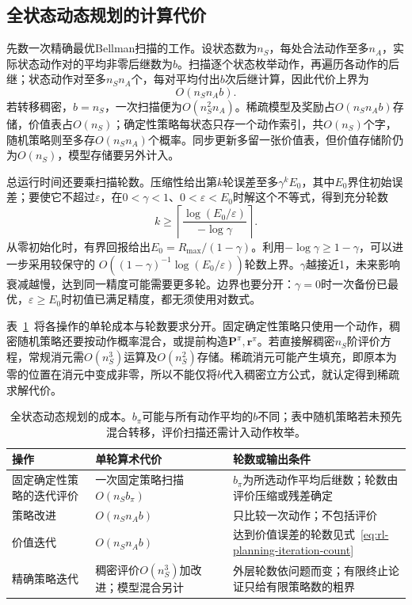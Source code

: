 \subsection{全状态动态规划的计算代价}
\label{sec:rl-planning-dp-complexity}

先数一次精确最优Bellman扫描的工作。设状态数为$n_S$，每处合法动作至多$n_A$，实际状态动作对的平均非零后继数为$b$。扫描逐个状态枚举动作，再遍历各动作的后继；状态动作对至多$n_Sn_A$个，每对平均付出$b$次后继计算，因此代价上界为
\begin{equation}
 O(n_Sn_Ab).
 \label{eq:rl-planning-sweep-cost}
\end{equation}
若转移稠密，$b=n_S$，一次扫描便为$O(n_S^2n_A)$。稀疏模型及奖励占$O(n_Sn_Ab)$存储，价值表占$O(n_S)$；确定性策略每状态只存一个动作索引，共$O(n_S)$个字，随机策略则至多存$O(n_Sn_A)$个概率。同步更新多留一张价值表，但价值存储阶仍为$O(n_S)$，模型存储要另外计入。

总运行时间还要乘扫描轮数。压缩性给出第$k$轮误差至多$\gamma^kE_0$，其中$E_0$界住初始误差；要使它不超过$\varepsilon$，在$0<\gamma<1$、$0<\varepsilon<E_0$时解这个不等式，得到充分轮数
\begin{equation}
 k\geq\left\lceil\frac{\log(E_0/\varepsilon)}{-\log\gamma}\right\rceil.
 \label{eq:rl-planning-iteration-count}
\end{equation}
从零初始化时，有界回报给出$E_0=R_{\max}/(1-\gamma)$。利用$-\log\gamma\geq1-\gamma$，可以进一步采用较保守的
$O((1-\gamma)^{-1}\log(E_0/\varepsilon))$轮数上界。$\gamma$越接近1，未来影响衰减越慢，达到同一精度可能需要更多轮。边界也要分开：$\gamma=0$时一次备份已最优，$\varepsilon\geq E_0$时初值已满足精度，都无须使用对数式。

表~\ref{tab:rl-planning-dp-costs}~将各操作的单轮成本与轮数要求分开。固定确定性策略只使用一个动作，稠密随机策略还要按动作概率混合，或提前构造$\bm P^\pi,\bm r^\pi$。若直接解稠密$n_S$阶评价方程，常规消元需$O(n_S^3)$运算及$O(n_S^2)$存储。稀疏消元可能产生填充，即原本为零的位置在消元中变成非零，所以不能仅将$b$代入稠密立方公式，就认定得到稀疏求解代价。

\begin{table}[htbp]
 \centering
 \small
 \begin{tabularx}{\linewidth}{@{}l>{\raggedright\arraybackslash}X>{\raggedright\arraybackslash}X@{}}
  \toprule
  操作 & 单轮算术代价 & 轮数或输出条件\\
  \midrule
  固定确定性策略的迭代评价 & 一次固定策略扫描$O(n_Sb_\pi)$ & $b_\pi$为所选动作平均后继数；轮数由评价压缩或残差确定\\
  策略改进 & $O(n_Sn_Ab)$ & 只比较一次动作；不包括评价\\
  价值迭代 & $O(n_Sn_Ab)$ & 达到价值误差的轮数见式~\eqref{eq:rl-planning-iteration-count}\\
  精确策略迭代 & 稠密评价$O(n_S^3)$加改进；模型混合另计 & 外层轮数依问题而变；有限终止论证只给有限策略数的粗界\\
  \bottomrule
 \end{tabularx}
 \caption{全状态动态规划的成本。$b_\pi$可能与所有动作平均的$b$不同；表中随机策略若未预先混合转移，评价扫描还需计入动作枚举。}
 \label{tab:rl-planning-dp-costs}
\end{table}

